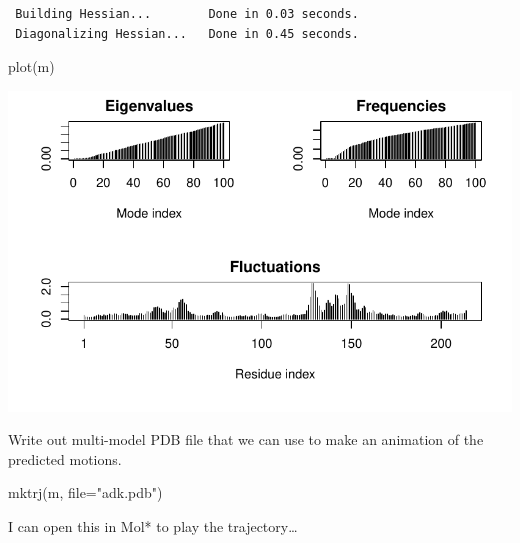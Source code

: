 \documentclass[
  letterpaper,
  DIV=11,
  numbers=noendperiod]{scrartcl}
\newenvironment{Shaded}{\begin{snugshade}}{\end{snugshade}}
\newcommand{\AttributeTok}[1]{\textcolor[rgb]{0.40,0.45,0.13}{#1}}
\newcommand{\FunctionTok}[1]{\textcolor[rgb]{0.28,0.35,0.67}{#1}}
\newcommand{\NormalTok}[1]{\textcolor[rgb]{0.00,0.23,0.31}{#1}}
\newcommand{\StringTok}[1]{\textcolor[rgb]{0.13,0.47,0.30}{#1}}
\begin{document}
\begin{verbatim}
 Building Hessian...        Done in 0.03 seconds.
 Diagonalizing Hessian...   Done in 0.45 seconds.
\end{verbatim}

\begin{Shaded}
\begin{Highlighting}[]
\FunctionTok{plot}\NormalTok{(m)}
\end{Highlighting}
\end{Shaded}

\includegraphics{NLclass09_files/figure-pdf/unnamed-chunk-21-1.pdf}

Write out multi-model PDB file that we can use to make an animation of
the predicted motions.

\begin{Shaded}
\begin{Highlighting}[]
\FunctionTok{mktrj}\NormalTok{(m, }\AttributeTok{file=}\StringTok{"adk.pdb"}\NormalTok{)}
\end{Highlighting}
\end{Shaded}

I can open this in Mol* to play the trajectory\ldots{}
\end{document}
